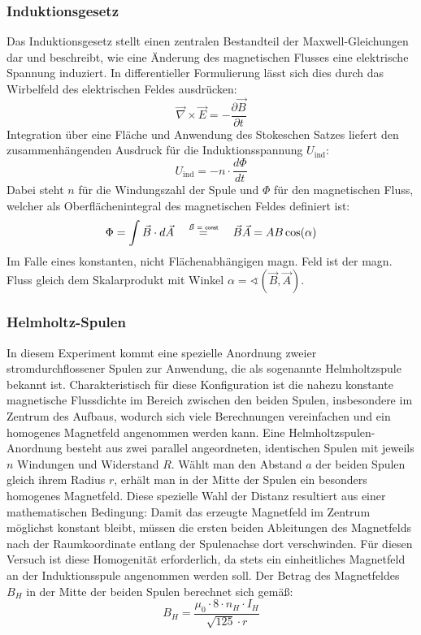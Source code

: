 \subsubsection{Induktionsgesetz}
Das Induktionsgesetz stellt einen zentralen Bestandteil der Maxwell-Gleichungen dar und beschreibt, wie eine Änderung des magnetischen Flusses eine elektrische Spannung induziert. In differentieller Formulierung lässt sich dies durch das Wirbelfeld des elektrischen Feldes ausdrücken:
\begin{equation} \label{eq:maxwell_faraday}
    \vec{\nabla} \times \vec{E} = -\frac{\partial \vec{B}}{\partial t}
\end{equation}
Integration über eine Fläche und Anwendung des Stokeschen Satzes liefert den zusammenhängenden Ausdruck für die Induktionsspannung \( U_{\text{ind}}\):
\begin{equation} \label{eq:flux_definition}
    U_{\text{ind}} = -n \cdot \frac{d\Phi}{dt}
\end{equation}
Dabei steht \( n \) für die Windungszahl der Spule und \( \Phi \) für den magnetischen Fluss, welcher als Oberflächenintegral des magnetischen Feldes definiert ist:
\begin{equation} \label{eq:magnetic_flux}
    \Phi = \int \vec{B} \cdot d\vec{A}\quad\mathrel{ \overset{\mbox{\normalfont\tiny\sffamily \(\vec{B}=\text{const}\)}}{ \underset{\mbox{\normalfont\tiny\sffamily }}{=} } }\quad\vec{B}\vec{A}=AB\cos(\alpha)
\end{equation}
Im Falle eines konstanten, nicht Flächenabhängigen magn. Feld ist der magn. Fluss gleich dem Skalarprodukt mit Winkel \(\alpha=\sphericalangle (\vec{B},\vec{A})\). 

\subsubsection{Helmholtz-Spulen}
In diesem Experiment kommt eine spezielle Anordnung zweier stromdurchflossener Spulen zur Anwendung, die als sogenannte Helmholtzspule bekannt ist. Charakteristisch für diese Konfiguration ist die nahezu konstante magnetische Flussdichte im Bereich zwischen den beiden Spulen, insbesondere im Zentrum des Aufbaus, wodurch sich viele Berechnungen vereinfachen und ein homogenes Magnetfeld angenommen werden kann. Eine Helmholtzspulen-Anordnung besteht aus zwei parallel angeordneten, identischen Spulen mit jeweils \( n \) Windungen und Widerstand \(R\). Wählt man den Abstand \( a \) der beiden Spulen gleich ihrem Radius \( r \), erhält man in der Mitte der Spulen ein besonders homogenes Magnetfeld. Diese spezielle Wahl der Distanz resultiert aus einer mathematischen Bedingung: Damit das erzeugte Magnetfeld im Zentrum möglichst konstant bleibt, müssen die ersten beiden Ableitungen des Magnetfelds nach der Raumkoordinate entlang der Spulenachse dort verschwinden. Für diesen Versuch ist diese Homogenität erforderlich, da stets ein einheitliches Magnetfeld an der Induktionsspule angenommen werden soll. Der Betrag des Magnetfeldes \( B_H \) in der Mitte der beiden Spulen berechnet sich gemäß\autocite{Helmholtz}:
\begin{equation} \label{eq:helmholtz_field}
    B_H = \frac{\mu_0 \cdot 8 \cdot n_H \cdot I_H}{\sqrt{125} \cdot r}
\end{equation}

